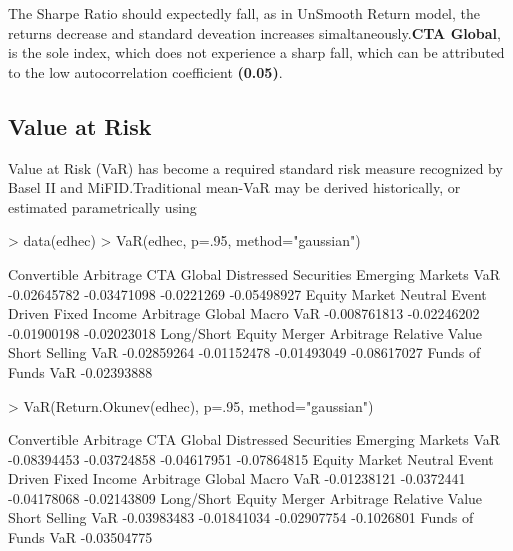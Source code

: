 \documentclass[12pt,letterpaper,english]{article}
\begin{document}
The Sharpe Ratio should expectedly fall, as in UnSmooth Return model, the returns decrease and standard deveation increases simaltaneously.\textbf{CTA Global}, is the sole index, which does not experience a sharp fall, which can be attributed to the low autocorrelation coefficient \textbf{(0.05)}. 

\subsection{Value at Risk }

Value at Risk (VaR) has become a required standard risk measure recognized by Basel II and MiFID.Traditional mean-VaR may be derived historically, or estimated parametrically using



\begin{Schunk}
\begin{Sinput}
> data(edhec)
> VaR(edhec, p=.95, method="gaussian")
\end{Sinput}
\begin{Soutput}
    Convertible Arbitrage  CTA Global Distressed Securities Emerging Markets
VaR           -0.02645782 -0.03471098            -0.0221269      -0.05498927
    Equity Market Neutral Event Driven Fixed Income Arbitrage Global Macro
VaR          -0.008761813  -0.02246202            -0.01900198  -0.02023018
    Long/Short Equity Merger Arbitrage Relative Value Short Selling
VaR       -0.02859264      -0.01152478    -0.01493049   -0.08617027
    Funds of Funds
VaR    -0.02393888
\end{Soutput}
\begin{Sinput}
> VaR(Return.Okunev(edhec), p=.95, method="gaussian") 
\end{Sinput}
\begin{Soutput}
    Convertible Arbitrage  CTA Global Distressed Securities Emerging Markets
VaR           -0.08394453 -0.03724858           -0.04617951      -0.07864815
    Equity Market Neutral Event Driven Fixed Income Arbitrage Global Macro
VaR           -0.01238121   -0.0372441            -0.04178068  -0.02143809
    Long/Short Equity Merger Arbitrage Relative Value Short Selling
VaR       -0.03983483      -0.01841034    -0.02907754    -0.1026801
    Funds of Funds
VaR    -0.03504775
\end{Soutput}
\end{Schunk}
\end{document}
